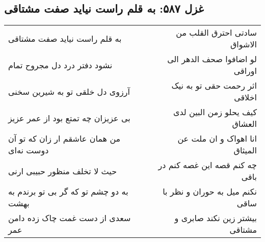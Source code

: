 \begin{center}
\section*{غزل ۵۸۷: به قلم راست نیاید صفت مشتاقی}
\label{sec:587}
\begin{longtable}{l p{0.5cm} r}
به قلم راست نیاید صفت مشتاقی
&&
سادتی احترق القلب من الاشواق
\\
نشود دفتر درد دل مجروح تمام
&&
لو اضافوا صحف الدهر الی اوراقی
\\
آرزوی دل خلقی تو به شیرین سخنی
&&
اثر رحمت حقی تو به نیک اخلاقی
\\
بی عزیزان چه تمتع بود از عمر عزیز
&&
کیف یحلو زمن البین لدی العشاق
\\
من همان عاشقم ار زان که تو آن دوست نه‌ای
&&
انا اهواک و ان ملت عن المیثاق
\\
حیث لا تخلف منظور حبیبی ارنی
&&
چه کنم قصه این غصه کنم در باقی
\\
به دو چشم تو که گر بی تو برندم به بهشت
&&
نکنم میل به حوران و نظر با ساقی
\\
سعدی از دست غمت چاک زده دامن عمر
&&
بیشتر زین نکند صابری و مشتاقی
\\
\end{longtable}
\end{center}
